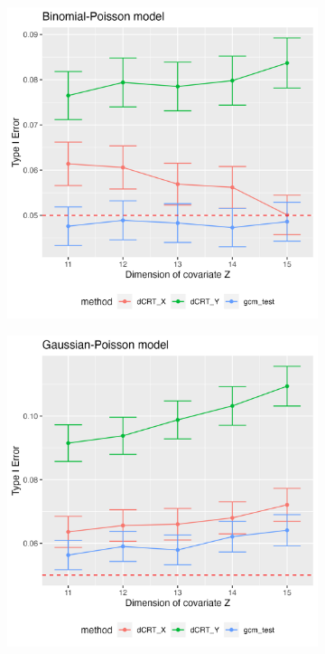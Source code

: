 \documentclass{article}
\begin{document}
\begin{figure}[ht]
    \begin{subfigure}{0.5\textwidth}
        \centering
        \includegraphics[width=\linewidth]{Figures/Q2/varying-dimension-binomial-poisson.png}
    \end{subfigure}%
    \begin{subfigure}{0.5\textwidth}
        \centering
        \includegraphics[width=\linewidth]{Figures/Q2/varying-dimension-gaussian-poisson.png} 
    \end{subfigure}


\end{figure}
\end{document}
